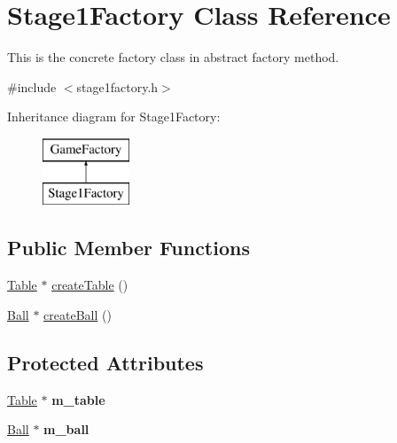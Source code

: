 \hypertarget{class_stage1_factory}{}\section{Stage1\+Factory Class Reference}
\label{class_stage1_factory}


This is the concrete factory class in abstract factory method.  




{\ttfamily \#include $<$stage1factory.\+h$>$}

Inheritance diagram for Stage1\+Factory\+:\begin{figure}[H]
\begin{center}
\leavevmode
\includegraphics[height=2.000000cm]{class_stage1_factory}
\end{center}
\end{figure}
\subsection*{Public Member Functions}
\begin{DoxyCompactItemize}
\item 
\mbox{\hyperlink{class_table}{Table}} $\ast$ \mbox{\hyperlink{class_stage1_factory_ad1a070c87d52b00654125bd9f439cf26}{create\+Table}} ()
\item 
\mbox{\hyperlink{class_ball}{Ball}} $\ast$ \mbox{\hyperlink{class_stage1_factory_a84b6d3dc3f6500cdc128bb553dacd4cc}{create\+Ball}} ()
\end{DoxyCompactItemize}
\subsection*{Protected Attributes}
\begin{DoxyCompactItemize}
\item 
\mbox{\label{class_stage1_factory_a82981d3a0cb0e98193e9176658d3e2ec}} 
\mbox{\hyperlink{class_table}{Table}} $\ast$ {\bfseries m\+\_\+table}
\item 
\mbox{\label{class_stage1_factory_ad9cff77690b74d1e0cce4b24466bfff4}} 
\mbox{\hyperlink{class_ball}{Ball}} $\ast$ {\bfseries m\+\_\+ball}
\end{DoxyCompactItemize}



